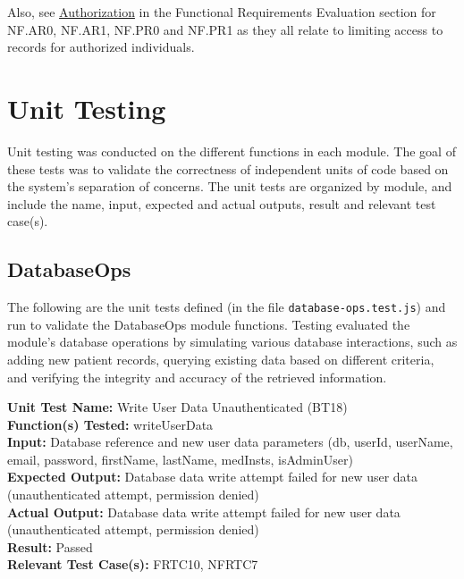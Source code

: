 \documentclass[12pt, titlepage]{article}
\begin{document}
Also, see \hyperlink{Auth}{Authorization} in the Functional Requirements Evaluation section for NF.AR0, NF.AR1, NF.PR0 and NF.PR1 as they all relate to limiting access to records for authorized individuals.


\section{Unit Testing}

Unit testing was conducted on the different functions in each module. The goal of these tests was to validate the correctness of independent units of code based on the system's separation of concerns. The unit tests are organized by module, and include the name, input, expected and actual outputs, result and relevant test case(s).

\subsection{DatabaseOps}
The following are the unit tests defined (in the file \texttt{database-ops.test.js}) and run to validate the DatabaseOps module functions. Testing evaluated the module's database operations by simulating various database interactions, such as adding new patient records, querying existing data based on different criteria, and verifying the integrity and accuracy of the retrieved information.

\begin{mdframed}[linewidth=0.5mm]
  \textbf{Unit Test Name:} Write User Data Unauthenticated (BT18) \\
  \textbf{Function(s) Tested:} writeUserData \\
  \textbf{Input:} Database reference and new user data parameters (db, userId, userName, email, password, firstName, lastName, medInsts, isAdminUser) \\
  \textbf{Expected Output:} Database data write attempt failed for new user data (unauthenticated attempt, permission denied) \\
  \textbf{Actual Output:} Database data write attempt failed for new user data (unauthenticated attempt, permission denied) \\
  \textbf{Result:} Passed \\
  \textbf{Relevant Test Case(s):} FRTC10, NFRTC7
\end{mdframed}
\end{document}
